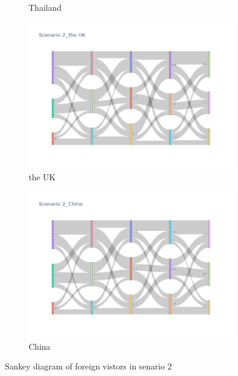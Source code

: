 \begin{figure}[h]
\begin{subfigure}{0.5\textwidth}
    \caption{Thailand}
  \end{subfigure}
  \begin{subfigure}{0.5\textwidth}
    \centering
    \includegraphics[width=\linewidth]{Figure/figure35b.png}
    \caption{the UK}
  \end{subfigure}
  \begin{subfigure}{0.5\textwidth}
    \centering
    \includegraphics[width=\linewidth]{Figure/figure36b.png}
    \caption{China}
  \end{subfigure}
  \caption{ Sankey diagram of foreign vistors in senario 2 }
  \label{fig33}
\end{figure}

